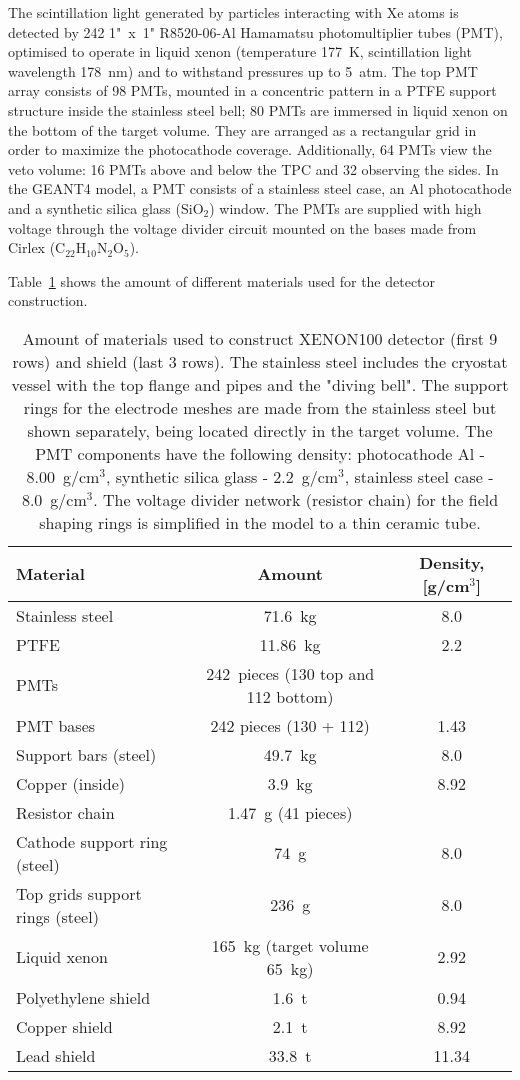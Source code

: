 The scintillation light generated by particles interacting with Xe atoms is detected by 242 1"~x~1" R8520-06-Al Hamamatsu photomultiplier tubes (PMT), optimised to  
operate in liquid xenon (temperature 177~K, scintillation light wavelength
178~nm) and to withstand pressures up to 5~atm. The top PMT array consists of 98 PMTs, mounted in a concentric pattern 
in a PTFE support structure inside the stainless steel bell; 80 PMTs are immersed in liquid xenon on the 
bottom of the target volume. They are arranged as a rectangular grid in order to maximize the photocathode coverage. Additionally, 64 PMTs view the veto volume: 16 PMTs above and below the TPC and 32 observing the sides.
In the GEANT4 model, a PMT consists of a stainless steel case, an Al photocathode and a synthetic silica glass (SiO$_{2}$) window.
The PMTs are supplied with high voltage through the voltage divider circuit mounted on the bases made from Cirlex (C$_{22}$H$_{10}$N$_{2}$O$_{5}$).

Table~\ref{tab:mass} shows the amount of different materials used for the detector construction.


\begin{table}[h!]
\centering
\caption{Amount of materials used to construct XENON100 detector (first 9 rows) and
  shield (last 3 rows). The stainless steel includes the cryostat vessel with the top flange and pipes and the "diving bell". The support rings for the electrode meshes are made from the stainless steel but  shown separately, being located directly in the target volume. The PMT components have the following density: photocathode Al - 8.00~g/cm$^3$, synthetic silica glass - 2.2~g/cm$^3$, stainless steel case - 8.0~g/cm$^3$. The voltage divider network (resistor chain) for the field shaping rings is simplified in the model to a thin ceramic tube.}

\begin{tabular}{lcc}
\hline
\bf{Material} & \bf{Amount} & \bf{Density, [g/cm$^3$]} \\
\hline
Stainless steel & 71.6~kg & 8.0\\
PTFE & 11.86~kg & 2.2\\
PMTs  & 242~pieces (130 top and 112 bottom) \\
PMT bases  & 242 pieces (130 + 112) & 1.43\\
Support bars (steel) & 49.7~kg & 8.0\\
Copper (inside) & 3.9~kg & 8.92\\
Resistor chain & 1.47~g (41 pieces) \\
Cathode support ring (steel) & 74~g & 8.0 \\
Top grids support rings (steel) & 236~g & 8.0\\
Liquid xenon  & 165~kg (target volume 65~kg) & 2.92\\
\hline
Polyethylene shield  & 1.6~t & 0.94\\
Copper shield & 2.1~t & 8.92\\
Lead shield  & 33.8~t & 11.34\\
\hline
\end{tabular}
\label{tab:mass}
\end{table}


